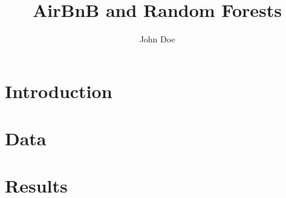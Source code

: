 \documentclass{article}
\author{John Doe}
\title{AirBnB and Random Forests}
\date{} %
\begin{document}
\maketitle

\section{Introduction}




\section{Data}



\section{Results}





\end{document}
